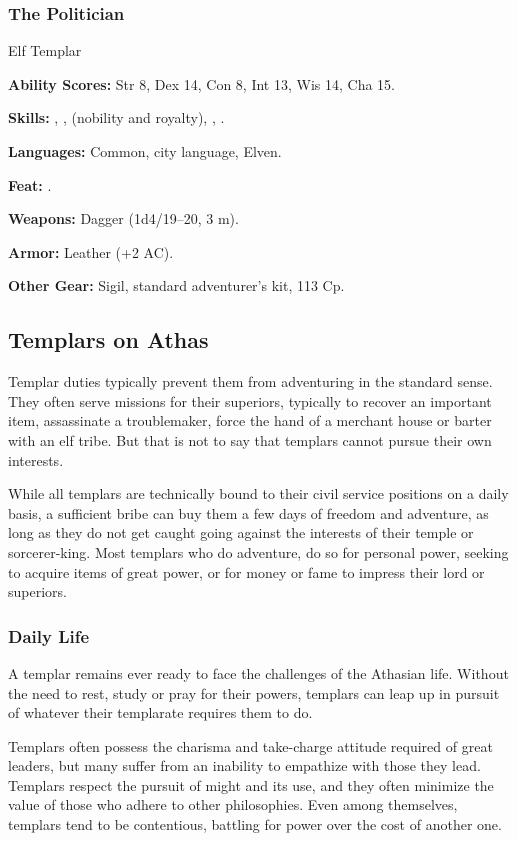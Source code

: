\subsubsection{The Politician}
Elf Templar

\textbf{Ability Scores:} Str 8, Dex 14, Con 8, Int 13, Wis 14, Cha 15.

\textbf{Skills:} , ,  (nobility and royalty), , .

\textbf{Languages:} Common, city language, Elven.

\textbf{Feat:} .

\textbf{Weapons:} Dagger (1d4/19--20, 3 m).

\textbf{Armor:} Leather (+2 AC).

\textbf{Other Gear:} Sigil, standard adventurer's kit, 113 Cp.

\subsection{Templars on Athas}

Templar duties typically prevent them from adventuring in the standard sense. They often serve missions for their superiors, typically to recover an important item, assassinate a troublemaker, force the hand of a merchant house or barter with an elf tribe. But that is not to say that templars cannot pursue their own interests.

While all templars are technically bound to their civil service positions on a daily basis, a sufficient bribe can buy them a few days of freedom and adventure, as long as they do not get caught going against the interests of their temple or sorcerer-king. Most templars who do adventure, do so for personal power, seeking to acquire items of great power, or for money or fame to impress their lord or superiors.

\subsubsection{Daily Life}
A templar remains ever ready to face the challenges of the Athasian life. Without the need to rest, study or pray for their powers, templars can leap up in pursuit of whatever their templarate requires them to do.

Templars often possess the charisma and take-charge attitude required of great leaders, but many suffer from an inability to empathize with those they lead. Templars respect the pursuit of might and its use, and they often minimize the value of those who adhere to other philosophies. Even among themselves, templars tend to be contentious, battling for power over the cost of another one.

